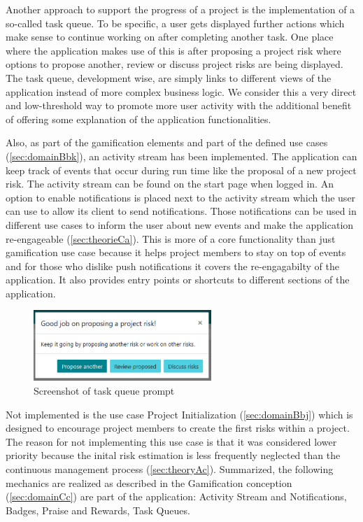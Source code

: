 Another approach to support the progress of a project is the implementation of a so-called task queue. To be specific, a user gets displayed further actions which make sense to continue working on after completing another task. One place where the application makes use of this is after proposing a project risk where options to propose another, review or discuss project risks are being displayed. The task queue, development wise, are simply links to different views of the application instead of more complex business logic. We consider this a very direct and low-threshold way to promote more user activity with the additional benefit of offering some explanation of the application functionalities.

Also, as part of the gamification elements and part of the defined use cases (\ref{sec:domainBbk}), an activity stream has been implemented. The application can keep track of events that occur during run time like the proposal of a new project risk. The activity stream can be found on the start page when logged in. An option to enable notifications is placed next to the activity stream which the user can use to allow its client to send notifications. Those notifications can be used in different use cases to inform the user about new events and make the application re-engageable (\ref{sec:theorieCa}). This is more of a core functionality than just gamification use case because it helps project members to stay on top of events and for those who dislike push notifications it covers the re-engagabilty of the application. It also provides entry points or shortcuts to different sections of the application.

\begin{figure}[H]
	\centering
	\includegraphics[width=0.6\textwidth]{Assets/implementation_shots/task_queue.png}
	\caption{Screenshot of task queue prompt}
	\label{fig:taskqueue}
\end{figure}

Not implemented is the use case Project Initialization (\ref{sec:domainBbj}) which is designed to encourage project members to create the first risks within a project. The reason for not implementing this use case is that it was considered lower priority because the inital risk estimation is less frequently neglected than the continuous management process (\ref{sec:theoryAc}).
Summarized, the following mechanics are realized as described in the Gamification conception (\ref{sec:domainCc}) are part of the application: Activity Stream and Notifications, Badges, Praise and Rewards, Task Queues.


